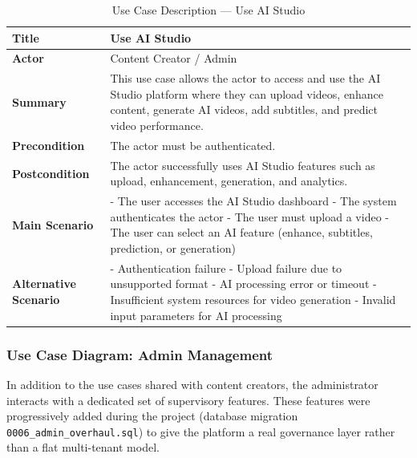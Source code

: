 \begin{table}[H]
\centering
\renewcommand{\arraystretch}{1.4}
\begin{tabular}{|p{4cm}|p{10cm}|}
\hline
\textbf{Title} & Use AI Studio \\ \hline

\textbf{Actor} & Content Creator / Admin \\ \hline

\textbf{Summary} & 
This use case allows the actor to access and use the AI Studio platform where they can upload videos, enhance content, generate AI videos, add subtitles, and predict video performance. \\ \hline

\textbf{Precondition} & 
The actor must be authenticated. \\ \hline

\textbf{Postcondition} & 
The actor successfully uses AI Studio features such as upload, enhancement, generation, and analytics. \\ \hline

\textbf{Main Scenario} & 
- The user accesses the AI Studio dashboard \newline
- The system authenticates the actor \newline
- The user must upload a video \newline
- The user can select an AI feature (enhance, subtitles, prediction, or generation) \\ \hline

\textbf{Alternative Scenario} & 
- Authentication failure \newline
- Upload failure due to unsupported format \newline
- AI processing error or timeout \newline
- Insufficient system resources for video generation \newline
- Invalid input parameters for AI processing \\ \hline

\end{tabular}
\caption{Use Case Description — Use AI Studio}
\label{tab:use-ai-studio}
\end{table}

\subsubsection*{Use Case Diagram: Admin Management}

In addition to the use cases shared with content creators, the administrator interacts with a dedicated set of supervisory features. These features were progressively added during the project (database migration \texttt{0006\_admin\_overhaul.sql}) to give the platform a real governance layer rather than a flat multi-tenant model.


